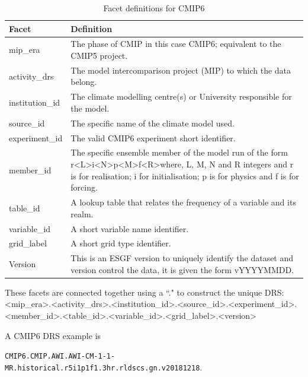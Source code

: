 \documentclass[final,1p,times,twocolumn,authoryear]{elsarticle}
\begin{document}
{\begin{table}[ht!]
\label{tab:cmip6}
\begin{tabular}{|p{3cm}|p{9.5cm}|}
\hline
\textbf{Facet}  & \textbf{Definition}  \\ \hline
mip\_era         & The phase of CMIP in this case CMIP6; equivalent to the CMIP5 project.\\ \hline
activity\_drs    & The model intercomparison project (MIP) to which the data belong. \\ \hline
institution\_id  & The climate modelling centre(s) or University responsible for the model. \\ \hline
source\_id       & The specific name of the climate model used.  \\ \hline
experiment\_id   & The valid CMIP6 experiment short identifier.  \\ \hline
member\_id       & The specific ensemble member of the model run of the form r\textless{}L\textgreater{}i\textless{}N\textgreater{}p\textless{}M\textgreater{}f\textless{}R\textgreater where, L, M, N and R integers and r is for realisation; i for initialisation; p is for physics and f is for forcing. \\ \hline
table\_id        & A lookup table that relates the frequency of a variable and its realm. \\ \hline
variable\_id     & A short variable name identifier. \\ \hline
grid\_label      & A short grid type identifier. \\ \hline
Version         & This is an ESGF version to uniquely identify the dataset and version control the data, it is given the form vYYYYMMDD. \\
\hline

\end{tabular}
\caption{Facet definitions for CMIP6}
\end{table}

These facets are connected together using a ``." to construct the unique DRS: 
\textless{}mip\_era\textgreater{}.\textless{}activity\_drs\textgreater{}.\textless{}institution\_id\textgreater{}.\textless{}source\_id\textgreater{}.\textless{}experiment\_id\textgreater{}.\textless{}member\_id\textgreater{}.\newline\textless{}table\_id\textgreater{}.\textless{}variable\_id\textgreater{}.\textless{}grid\_label\textgreater{}.\textless{}version\textgreater{}

A CMIP6 DRS example is \newline \small{\texttt{CMIP6.CMIP.AWI.AWI-CM-1-1-MR.historical.r5i1p1f1.3hr.rldscs.gn.v20181218}.\normalsize

}}
\end{document}
